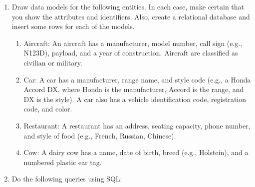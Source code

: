 \documentclass[
]{article}
\begin{document}
\begin{enumerate}
\def\labelenumi{\arabic{enumi}.}
\item
  Draw data models for the following entities. In each case, make certain that you show the attributes and identifiers. Also, create a relational database and insert some rows for each of the models.

  \begin{enumerate}
  \def\labelenumii{\alph{enumii}.}
  \item
    Aircraft: An aircraft has a manufacturer, model number, call sign (e.g., N123D), payload, and a year of construction. Aircraft are classified as civilian or military.
  \item
    Car: A car has a manufacturer, range name, and style code (e.g., a Honda Accord DX, where Honda is the manufacturer, Accord is the range, and DX is the style). A car also has a vehicle identification code, registration code, and color.
  \item
    Restaurant: A restaurant has an address, seating capacity, phone number, and style of food (e.g., French, Russian, Chinese).
  \item
    Cow: A dairy cow has a name, date of birth, breed (e.g., Holstein), and a numbered plastic ear tag.
  \end{enumerate}
\item
  Do the following queries using SQL:


\end{enumerate}
\end{document}
